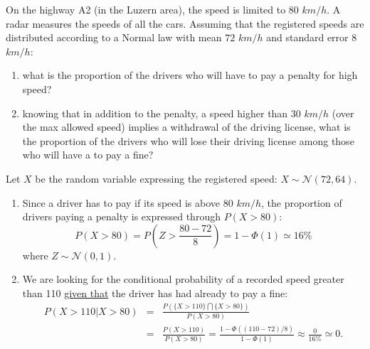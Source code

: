 \documentclass[notes=show,smaller,handout]{beamer}\usepackage[]{graphicx}\usepackage[]{color}
\begin{document}
\begin{frame}{\subsecname}


\begin{example}

On the highway A2 (in the Luzern area), the speed is limited to $80$ $km/h$. A radar measures the speeds of all the cars.
Assuming that the registered speeds are distributed according to a Normal law with mean $72$ $km/h$ and standard error $8$ $km/h$: \vspace{0.2cm}
\begin{enumerate}
  \item what is the proportion of the drivers who will have to pay a penalty for high speed? \vspace{0.2cm}
  \item knowing that in addition to the penalty, a speed higher than $30$ $km/h$ (over the max allowed speed) implies a withdrawal of the driving license, what is the proportion of the drivers who  will lose their driving license among those who will have a to pay a fine?
\end{enumerate}

\end{example}
\end{frame}



\begin{frame}{\subsecname}


\begin{example}[continued]
Let $X$ be the random variable expressing the registered speed: $X \sim \mathcal{N}(72,64)$.
\begin{enumerate}
  \item Since a driver has to pay if its speed is above  $80$ $km/h$, the proportion of drivers paying a penalty is expressed  through $P(X>80)$:
\begin{equation*}
P(X>80)= P\left(Z>\frac{80-72}{8} \right)=1-\Phi(1) \simeq 16 \%
\end{equation*}
where $Z \sim \mathcal{N}(0,1)$.
  \item We are looking for the conditional probability of a recorded speed greater than 110 \underline{given that} the driver has had already to pay a fine:
  \begin{eqnarray*}
  P(X>110 \vert X>80) &=&  \frac{P(\{X>110\} \bigcap \{X>80\})}{P(X>80)} \\
   &=& \frac{P(X>110)}{P(X>80)} = \frac{1- \Phi((110-72)/8)}{1-\Phi(1)}\approx \frac{0}{16\%}\simeq 0.
  \end{eqnarray*}


\end{enumerate}



\end{example}
\end{frame}
\end{document}

